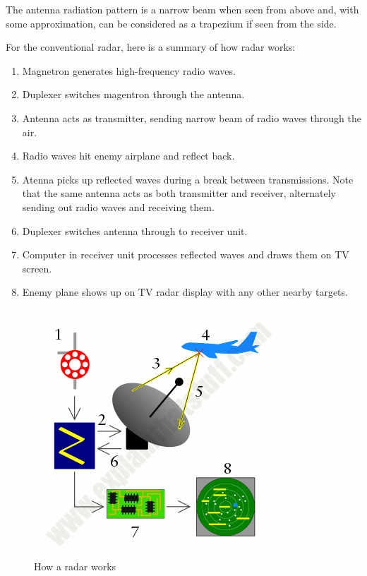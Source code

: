 \documentclass[13pt,a4paper]{report}
\begin{document}
                    \vspace{1mm}
                    \par The antenna radiation pattern is a narrow beam when seen from above and, with some 
                    approximation, can be considered as a trapezium if seen from the side. \\
                    \vspace{1mm}
                    \par For the conventional radar, here is a summary of how radar works:
                        \begin{enumerate}
                            \item Magnetron generates high-frequency radio waves.
                            \item Duplexer switches magentron through the antenna.
                            \item Antenna acts as transmitter, sending narrow beam of radio waves through the air.
                            \item Radio waves hit enemy airplane and reflect back.
                            \item Atenna picks up reflected waves during a break between transmissions. Note that the same antenna 
                            acts as both transmitter and receiver, alternately sending out radio waves and receiving them.
                            \item Duplexer switches antenna through to receiver unit.
                            \item Computer in receiver unit processes reflected waves and draws them on TV screen.
                            \item Enemy plane shows up on TV radar display with any other nearby targets. 
                        \end{enumerate}
                        \begin{figure}[H]
                            \centering
                            \includegraphics[width=0.8\linewidth]{radar-work.png}
                            \caption{\label{fig:pic}How a radar works}
                        \end{figure}
\end{document}
